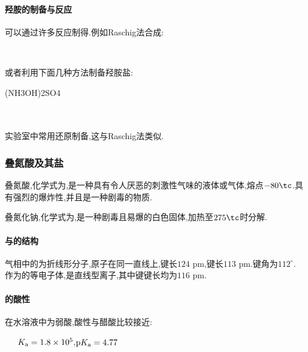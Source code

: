 \documentclass{ctexart}
\begin{document}
\paragraph{羟胺的制备与反应}
可以通过许多反应制得.例如Raschig法合成:
\begin{center}
    \\
\end{center}
或者利用下面几种方法制备羟胺盐:
\begin{center}
     (NH3OH)2SO4\\
    \\
    \ \ \ \ \ 
\end{center}
实验室中常用还原制备,这与Raschig法类似.
\subsubsection{叠氮酸及其盐}
\begin{substance}[\ce{HN3}]
    叠氮酸,化学式为,是一种具有令人厌恶的刺激性气味的液体或气体,熔点$-80\tc$.具有强烈的爆炸性,并且是一种剧毒的物质.
\end{substance}
\begin{substance}[\ce{NaN3}]
    叠氮化钠,化学式为,是一种剧毒且易爆的白色固体,加热至$275\tc$时分解.
\end{substance}
\paragraph{与的结构}
气相中的为折线形分子,原子在同一直线上,键长$124\text{ pm}$,键长$113\text{ pm}$.键角为$112^\circ$.\\
\indent {}作为的等电子体,是直线型离子,其中键键长均为$116\text{ pm}$.
\paragraph{的酸性}
在水溶液中为弱酸,酸性与醋酸比较接近:
\begin{center}
    \ \ \ $K_\text a=1.8\times10^5$,$\text pK_\text a=4.77$
\end{center}
\end{document}
